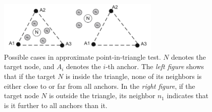 \documentclass[a4paper,12pt]{article}
\begin{document}
\begin{enumerate}[label=(\alph*)]
\begin{enumerate}[label=(\roman*)]
    \begin{figure}[h]
      \centering
      \includegraphics[width=0.7\textwidth]{img/apit-test}
      \caption{\label{fig:apit-test}Possible cases in approximate point-in-triangle test. $N$ denotes the target node, and $A_i$ denotes the $i$-th anchor. The \textit{left figure} shows that if the target $N$ is inside the triangle, none of its neighbors is either close to or far from all anchors. In the \textit{right figure}, if the target node $N$ is outside the triangle, its neighbor $n_1$ indicates that is it further to all anchors than it.}
    \end{figure}



\end{enumerate}
\end{enumerate}
\end{document}
